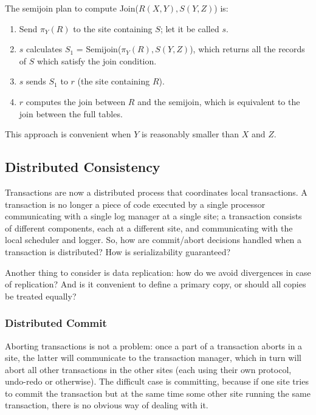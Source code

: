 The semijoin plan to compute Join($R(X,Y), S(Y,Z)$) is:
\begin{enumerate}
    \item Send $\pi_Y(R)$ to the site containing $S$; let it be called $s$.

    \item $s$ calculates $S_1$ = Semijoin($\pi_Y(R), S(Y,Z)$), which returns all the records of $S$ which satisfy the join condition.

    \item $s$ sends $S_1$ to $r$ (the site containing $R$).

    \item $r$ computes the join between $R$ and the semijoin, which is equivalent to the join between the full tables.
\end{enumerate}
This approach is convenient when $Y$ is reasonably smaller than $X$ and $Z$.

\subsection{Distributed Consistency}

Transactions are now a distributed process that coordinates local transactions. A transaction is no longer a piece of code executed by a single processor communicating with a single log manager at a single site; a transaction consists of different components, each at a different site, and communicating with the local scheduler and logger. So, how are commit/abort decisions handled when a transaction is distributed? How is serializability guaranteed?

Another thing to consider is data replication: how do we avoid divergences in case of replication? And is it convenient to define a primary copy, or should all copies be treated equally?

\subsubsection{Distributed Commit}

Aborting transactions is not a problem: once a part of a transaction aborts in a site, the latter will communicate to the transaction manager, which in turn will abort all other transactions in the other sites (each using their own protocol, undo-redo or otherwise). The difficult case is committing, because if one site tries to commit the transaction but at the same time some other site running the same transaction, there is no obvious way of dealing with it.

